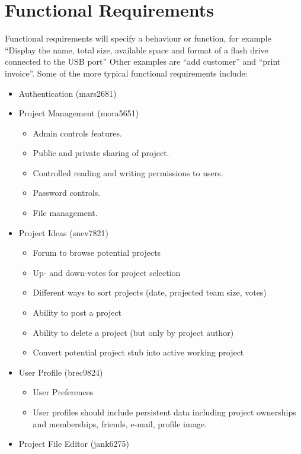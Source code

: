 \documentclass[11pt]{report}
\begin{document}
\section{Functional Requirements}
    Functional requirements will specify a behaviour or function, for example ``Display the name, total size, available space and format of a flash drive connected to the USB port'' Other examples are ``add customer'' and ``print invoice''. Some of the more typical functional requirements include:
    \begin{itemize}
        \item Authentication (mars2681)
        \item Project Management (mora5651) \begin{itemize}
            \item Admin controls features.  
            \item Public and private sharing of project.
            \item Controlled reading and writing permissions to users. 
            \item Password controls. 
            \item File management. 
            \end{itemize}
        \item Project Ideas (snev7821) \begin{itemize}
            \item Forum to browse potential projects
            \item Up- and down-votes for project selection
            \item Different ways to sort projects (date, projected team size, votes)
            \item Ability to post a project
            \item Ability to delete a project (but only by project author)
            \item Convert potential project stub into active working project \end{itemize}
        \item User Profile (brec9824) \begin{itemize}
            \item User Preferences
            \item User profiles should include persistent data including project ownerships and  memberships, friends, e-mail, profile image. 
            \end{itemize}
        \item Project File Editor (jank6275) \begin{itemize}

\end{itemize}
\end{itemize}
\end{document}
